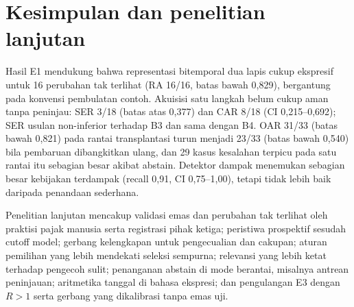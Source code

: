 \documentclass[journal,a4paper]{IEEEtran}
\makeatletter
\DeclareRobustCommand{\en}[1]{{\usefont{\f@encoding}{\f@family}{\f@series}{it}#1\/}}
\makeatother
\begin{document}
\section{Kesimpulan dan penelitian lanjutan}
\label{sec:kesimpulan}
Hasil E1 mendukung bahwa representasi bitemporal dua lapis cukup ekspresif untuk 16 perubahan tak terlihat (RA 16/16, batas bawah 0,829), bergantung pada konvensi pembulatan contoh. Akuisisi satu langkah belum cukup aman tanpa peninjau: SER 3/18 (batas atas 0,377) dan CAR 8/18 (CI 0,215--0,692); SER usulan non-inferior terhadap B3 dan sama dengan B4. OAR 31/33 (batas bawah 0,821) pada rantai transplantasi turun menjadi 23/33 (batas bawah 0,540) bila pembaruan dibangkitkan ulang, dan 29 kasus kesalahan terpicu pada satu rantai itu sebagian besar akibat \en{abstain}. Detektor dampak menemukan sebagian besar kebijakan terdampak (\en{recall} 0,91, CI 0,75--1,00), tetapi tidak lebih baik daripada penandaan sederhana.

Penelitian lanjutan mencakup validasi emas dan perubahan tak terlihat oleh praktisi pajak manusia serta registrasi pihak ketiga; peristiwa prospektif sesudah \en{cutoff} model; gerbang kelengkapan untuk pengecualian dan cakupan; aturan pemilihan yang lebih mendekati seleksi sempurna; relevansi yang lebih ketat terhadap pengecoh sulit; penanganan \en{abstain} di mode berantai, misalnya antrean peninjauan; aritmetika tanggal di bahasa ekspresi; dan pengulangan E3 dengan $R > 1$ serta gerbang yang dikalibrasi tanpa emas uji.



\end{document}
